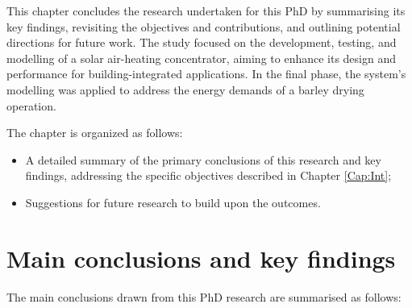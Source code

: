 %

This chapter concludes the research undertaken for this PhD by summarising its key findings, revisiting the objectives and contributions, and outlining potential directions for future work. The study focused on the development, testing, and modelling of a solar air-heating concentrator, aiming to enhance its design and performance for building-integrated applications. In the final phase, the system’s modelling was applied to address the energy demands of a barley drying operation. 

The chapter is organized as follows:

\begin{itemize}
	\item A detailed summary of the primary conclusions of this research and key findings, addressing the specific objectives described in Chapter \ref{Cap:Int};
	\item Suggestions for future research to build upon the outcomes.
\end{itemize}


\section{Main conclusions and key findings}

The main conclusions drawn from this PhD research are summarised as follows:

